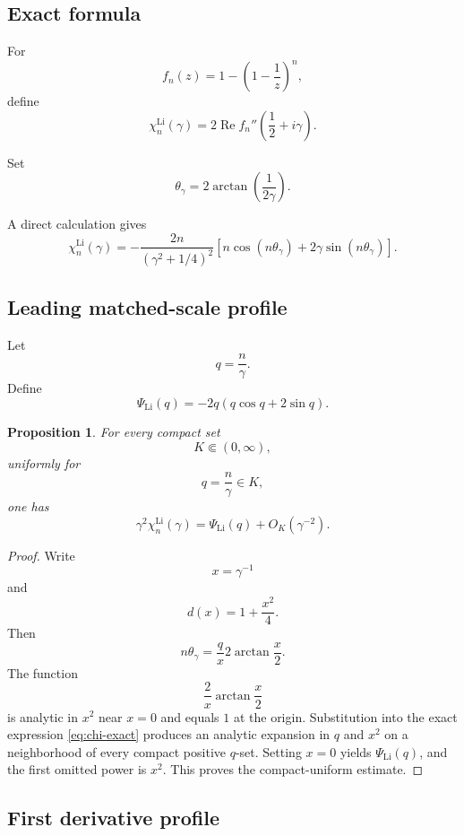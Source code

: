 \documentclass[11pt]{article}
\newtheorem{proposition}[theorem]{Proposition}
\newcommand{\LiSus}{\chi^{\mathrm{Li}}}
\begin{document}
\subsection{Exact formula}

For
\[
f_n(z)
=
1-
\left(
1-\frac1z
\right)^n,
\]
define
\[
\LiSus_n(\gamma)
=
2\operatorname{Re}
f_n''
\left(
\frac12+i\gamma
\right).
\]

Set
\[
\theta_\gamma
=
2\arctan
\left(
\frac1{2\gamma}
\right).
\]

A direct calculation gives
\begin{equation}
\label{eq:chi-exact}
\LiSus_n(\gamma)
=
-
\frac{2n}
{
(\gamma^2+1/4)^2
}
\left[
n\cos(n\theta_\gamma)
+
2\gamma\sin(n\theta_\gamma)
\right].
\end{equation}

\subsection{Leading matched-scale profile}

Let
\[
q=\frac n\gamma.
\]
Define
\begin{equation}
\label{eq:Psi}
\Psi_{\mathrm{Li}}(q)
=
-2q
\left(
q\cos q+2\sin q
\right).
\end{equation}

\begin{proposition}
\label{prop:chi-profile}
For every compact set
\[
K\Subset(0,\infty),
\]
uniformly for
\[
q=\frac n\gamma\in K,
\]
one has
\[
\gamma^2\LiSus_n(\gamma)
=
\Psi_{\mathrm{Li}}(q)
+
O_K(\gamma^{-2}).
\]
\end{proposition}

\begin{proof}
Write
\[
x=\gamma^{-1}
\]
and
\[
d(x)=1+\frac{x^2}{4}.
\]
Then
\[
n\theta_\gamma
=
\frac qx
2\arctan\frac x2.
\]
The function
\[
\frac2x\arctan\frac x2
\]
is analytic in \(x^2\) near \(x=0\) and equals \(1\) at the origin.
Substitution into the exact expression
\eqref{eq:chi-exact} produces an analytic expansion in \(q\) and \(x^2\)
on a neighborhood of every compact positive \(q\)-set. Setting
\(x=0\) yields \(\Psi_{\mathrm{Li}}(q)\), and the first omitted power is
\(x^2\). This proves the compact-uniform estimate.
\end{proof}

\subsection{First derivative profile}
\end{document}
